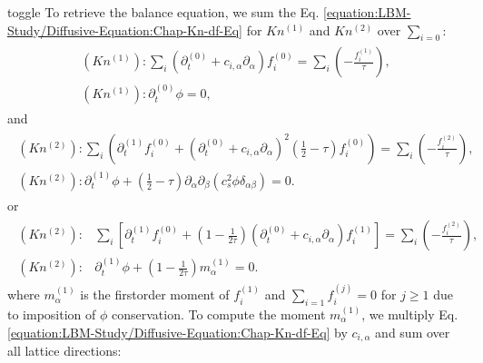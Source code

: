 \documentclass[letterpaper,10pt,english,openany,oneside]{jupyterBook}
\begin{document}
\begin{sphinxuseclass}{toggle}
\sphinxAtStartPar
To retrieve the balance equation, we sum the Eq. \eqref{equation:LBM-Study/Diffusive-Equation:Chap-Kn-df-Eq} for \(Kn^{(1)}\) and \(Kn^{(2)}\) over \(\sum_{i=0} \):
\begin{equation*}
\begin{split}
\begin{array}{l}
(Kn^{(1)}): \displaystyle\sum_{i}\left( \partial_{t}^{(0)} + c_{i,\alpha}\partial_{\alpha} \right)f_{i}^{(0)}= \displaystyle\sum_{i} \left(- \displaystyle\frac{ f_{i}^{(1)} }{ \tau } \right),\\
(Kn^{(1)}): \partial_{t}^{(0)}  \phi =0,
\end{array}
\end{split}
\end{equation*}
\sphinxAtStartPar
and
\begin{equation*}
\begin{split}
\begin{array}{l}
(Kn^{(2)}): \displaystyle\sum_{i}\left( \partial_{t}^{(1)} f_{i}^{(0)} + \left( \partial_{t}^{(0)} + c_{i,\alpha}\partial_{\alpha} \right)^{2} \displaystyle\left( \frac{1}{2}-\tau\right) f_{i}^{(0)} \right) =  \displaystyle\sum_{i}\left( - \displaystyle\frac{ f_{i}^{(2)} }{ \tau } \right), \\
(Kn^{(2)}): \partial_{t}^{(1)}\phi + \left( \displaystyle\frac{1}{2}-\tau\right) \partial_{\alpha}\partial_{\beta} \left(c_{s}^{2} \phi \delta_{\alpha\beta} \right) =0. 
\end{array}
\end{split}
\end{equation*}
\sphinxAtStartPar
or
\begin{equation}\label{equation:LBM-Study/Diffusive-Equation:df-Kn1-0-B0}
\begin{split}
\begin{array}{ll}
(Kn^{(2)}):& \displaystyle\sum_{i}\left[ \partial_{t}^{(1)} f_{i}^{(0)} + \left(1-\displaystyle\frac{1}{2\tau}\right)\left( \partial_{t}^{(0)} + c_{i,\alpha}\partial_{\alpha} \right) f_{i}^{(1)}   \right]=  \displaystyle\sum_{i}\left( - \displaystyle\frac{f_{i}^{(2)}}{\tau} \right), \nonumber \\
(Kn^{(2)}):& \partial_{t}^{(1)}\phi + \left(1-\displaystyle\frac{1}{2\tau}\right) m^{(1)}_{\alpha} = 0.
\end{array}
\end{split}
\end{equation}
\sphinxAtStartPar
where \(m^{(1)}_{\alpha}\) is the first\sphinxhyphen{}order moment of \(f_{i}^{(1)}\) and \(\sum_{i=1}f_{i}^{(j)}=0\) for \(j\geq 1\) due to imposition of \(\phi\) conservation. To compute the moment \(m^{(1)}_{\alpha}\), we multiply Eq. \eqref{equation:LBM-Study/Diffusive-Equation:Chap-Kn-df-Eq} by \(c_{i,\alpha}\) and sum over all lattice directions:

\end{sphinxuseclass}
\end{document}
